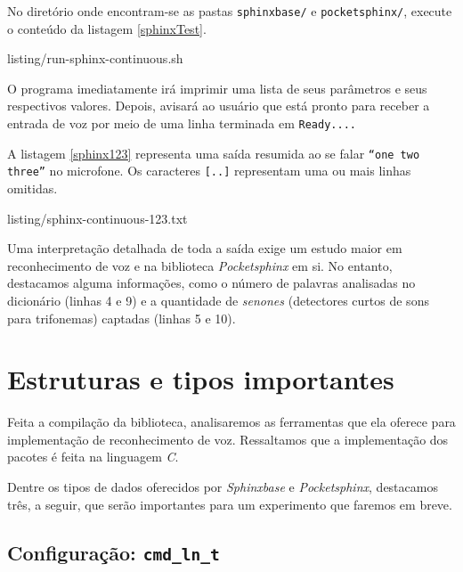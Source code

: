 No diretório onde encontram-se as pastas \texttt{sphinxbase/} e \texttt{pocketsphinx/}, execute o conteúdo da listagem \ref{sphinxTest}.


  {listing/run-sphinx-continuous.sh}

O programa imediatamente irá imprimir uma lista de seus parâmetros e seus respectivos valores. Depois, avisará ao usuário que está pronto para receber a entrada de voz por meio de uma linha terminada em \texttt{Ready....}

A listagem \ref{sphinx123} representa uma saída resumida ao se falar \texttt{``one two three''} no microfone. Os caracteres \texttt{[..]} representam uma ou mais linhas omitidas.


  {listing/sphinx-continuous-123.txt}

Uma interpretação detalhada de toda a saída exige um estudo maior em reconhecimento de voz e na biblioteca \textit{Pocketsphinx} em si. No entanto, destacamos alguma informações, como o número de palavras analisadas no dicionário (linhas 4 e 9) e a quantidade de \textit{senones} (detectores curtos de sons para trifonemas) captadas (linhas 5 e 10).


\section{Estruturas e tipos importantes}
\label{pocketsphinx-structs}

Feita a compilação da biblioteca, analisaremos as ferramentas que ela oferece para implementação de reconhecimento de voz. Ressaltamos que a implementação dos pacotes é feita na linguagem \textit{C}.

Dentre os tipos de dados oferecidos por \textit{Sphinxbase} e \textit{Pocketsphinx}, destacamos três, a seguir, que serão importantes para um experimento que faremos em breve.


\subsection{Configuração: \texttt{cmd\_ln\_t}}

